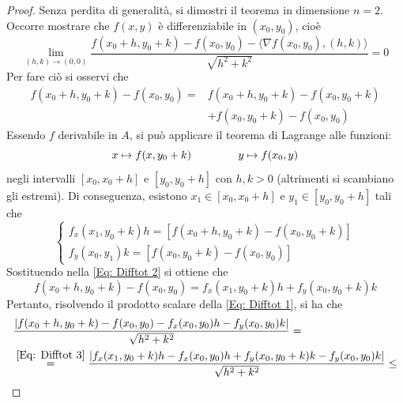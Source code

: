     \begin{proof}
        Senza perdita di generalità, si dimostri il teorema in dimensione $n=2$. Occorre mostrare che $f(x,y)$ è differenziabile in $(x_0, y_0)$, cioè
        \begin{equation} \label{Eq: Difftot 1}
            \lim_{(h,k) \to (0,0)} \frac{f(x_0+h, y_0+k)-f(x_0, y_0)-\langle\nabla f(x_0, y_0), (h,k)\rangle}{\sqrt{h^2+k^2}}=0
        \end{equation}
        Per fare ciò si osservi che
        \begin{equation} \label{Eq: Difftot 2}
            \begin{aligned}
                f(x_0+h, y_0+k)-f(x_0, y_0)=&f(x_0+h, y_0+k)-f(x_0, y_0+k)\\&+f(x_0, y_0+k)-f(x_0, y_0)
            \end{aligned}
        \end{equation}
        Essendo $f$ derivabile in $A$, si può applicare il teorema di Lagrange alle funzioni:
        \begin{equation}
            x \mapsto f(x, y_0+k) \hspace{1.5cm} y \mapsto f(x_0, y)
        \end{equation}
        negli intervalli $[x_0, x_0+h]$ e $[y_0, y_0+h]$ con $h,k>0$ (altrimenti si scambiano gli estremi).
        Di conseguenza, esistono $x_1 \in [x_0, x_0+h] $ e $y_1 \in [y_0, y_0+h]$ tali che
        \begin{equation}
            \begin{cases}
                f_x(x_1, y_0+k)h=\left[f(x_0+h, y_0+k)-f(x_0, y_0+k)\right]\\
                f_y(x_0, y_1)k=\left[f(x_0, y_0+k)-f(x_0, y_0) \right]
            \end{cases}
        \end{equation}
        Sostituendo nella \eqref{Eq: Difftot 2} si ottiene che
        \begin{equation} \label{Eq: Difftot 3}
            f(x_0+h, y_0+k)-f(x_0, y_0)=f_x(x_1, y_0+k)h+f_y(x_0, y_0+k)k
        \end{equation}
        Pertanto, risolvendo il prodotto scalare della \eqref{Eq: Difftot 1}, si ha che
        \begin{equation}
            \begin{aligned}
                &\frac{|f(x_0+h, y_0+k)-f(x_0, y_0)-f_x(x_0, y_0)h-f_y(x_0, y_0)k|}{\sqrt{h^2+k^2}}=\\
                &\overset{\eqref{Eq: Difftot 3}}{=}\frac{|f_x(x_1, y_0+k)h-f_x(x_0, y_0)h+f_y(x_0, y_0+k)k-f_y(x_0, y_0)k|}{\sqrt{h^2+k^2}}\leq\\

\end{aligned}
\end{equation}
\end{proof}
